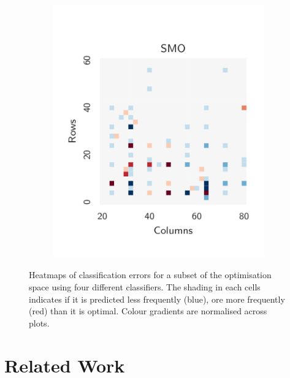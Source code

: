 \documentclass[nonatbib,preprint,9pt]{sigplanconf}
\begin{document}
\begin{figure}
\begin{subfigure}[t]{0.48\columnwidth}
\vspace{-1.5em} %
\caption{}
\label{fig:class-hmaps-3}
\end{subfigure}
\begin{subfigure}[t]{0.48\columnwidth}
\centering
\includegraphics[width=\columnwidth]{img/heatmap_5}
\vspace{-1.5em} %
\caption{}
\label{fig:class-hmaps-4}
\end{subfigure}
\caption{%
  Heatmaps of classification errors for a subset of the optimisation
  space using four different classifiers. The shading in each cells
  indicates if it is predicted less frequently (blue), ore more
  frequently (red) than it is optimal. Colour gradients are normalised
  across plots.%
}
\label{fig:class-hmaps}
\end{figure}



\section{Related Work}\label{sec:related}
\end{document}
